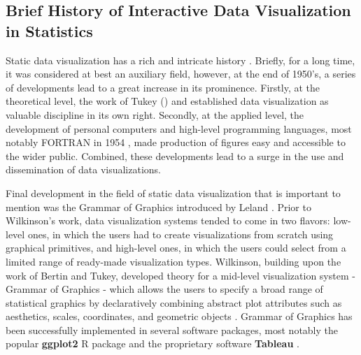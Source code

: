 \documentclass[12pt,a4paper]{article}
\begin{document}
\subsection{Brief History of Interactive Data Visualization in Statistics}
\label{sec:briefhistory}

Static data visualization has a rich and intricate history \citep[see e.g.][]{dix1998,friendly2006, friendly2021,young2011}. Briefly, for a long time, it was considered at best an auxiliary field, however, at the end of 1950's, a series of developments lead to a great increase in its prominence. Firstly, at the theoretical level, the work of Tukey (\citeyear{tukey1962,tukey1977}) and \cite{bertin1967} established data visualization as valuable discipline in its own right. Secondly, at the applied level, the development of personal computers \citep[see e.g.][]{abbate1999} and high-level programming languages, most notably FORTRAN in 1954 \citep{backus1978}, made production of figures easy and accessible to the wider public. Combined, these developments lead to a surge in the use and dissemination of data visualizations.

Final development in the field of static data visualization that is important to mention was the Grammar of Graphics introduced by Leland \cite{wilkinson2012}. Prior to Wilkinson's work, data visualization systems tended to come in two flavors: low-level ones, in which the users had to create visualizations from scratch using graphical primitives, and high-level ones, in which the users could select from a limited range of ready-made visualization types. Wilkinson, building upon the work of Bertin and Tukey, developed theory for a mid-level visualization system - Grammar of Graphics - which allows the users to specify a broad range of statistical graphics by declaratively combining abstract plot attributes such as aesthetics, scales, coordinates, and geometric objects \citep{wilkinson2012}. Grammar of Graphics has been successfully implemented in several software packages, most notably the popular \textbf{ggplot2} R package \citep{wickham2010} and the proprietary software \textbf{Tableau} \citep{tableau2023}. 
\end{document}
